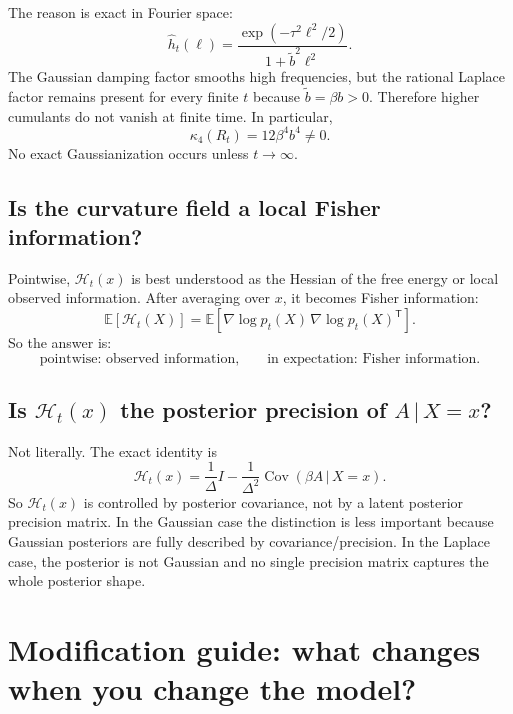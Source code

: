 \documentclass[11pt]{article}
\newcommand{\E}{\mathbb{E}}
\newcommand{\Cov}{\operatorname{Cov}}
\newcommand{\1}{\mathbf{1}}
\newcommand{\trans}{^{\mathsf T}}
\newcommand{\pt}{p_t}
\newcommand{\curv}{\mathcal{H}}
\newcommand{\given}{\,|\,}
\newcommand{\sq}[1]{\left[#1\right]}
\theoremstyle{definition}
\begin{document}
The reason is exact in Fourier space:
\begin{equation}
\widehat h_t(\ell)=\frac{\exp(-\tau^2\ell^2/2)}{1+\tilde b^2\ell^2}.
\end{equation}
The Gaussian damping factor smooths high frequencies, but the rational Laplace factor remains present for every finite \(t\) because \(\tilde b=\beta b>0\). Therefore higher cumulants do not vanish at finite time. In particular,
\begin{equation}
\kappa_4(R_t)=12\beta^4b^4\neq 0.
\end{equation}
No exact Gaussianization occurs unless \(t\to \infty\).

\subsection{Is the curvature field a local Fisher information?}

Pointwise, \(\curv_t(x)\) is best understood as the Hessian of the free energy or local observed information. After averaging over \(x\), it becomes Fisher information:
\begin{equation}
\E\sq{\curv_t(X)} = \E\sq{\nabla \log \pt(X)\,\nabla \log \pt(X)\trans}.
\end{equation}
So the answer is:
\begin{equation}
\text{pointwise: observed information,}
\qquad
\text{in expectation: Fisher information.}
\end{equation}

\subsection{Is \(\curv_t(x)\) the posterior precision of \(A\given X=x\)?}

Not literally. The exact identity is
\begin{equation}
\curv_t(x)=\frac{1}{\Delta}I - \frac{1}{\Delta^2}\Cov(\beta A\given X=x).
\end{equation}
So \(\curv_t(x)\) is controlled by posterior covariance, not by a latent posterior precision matrix. In the Gaussian case the distinction is less important because Gaussian posteriors are fully described by covariance/precision. In the Laplace case, the posterior is not Gaussian and no single precision matrix captures the whole posterior shape.

\section{Modification guide: what changes when you change the model?}
\end{document}
